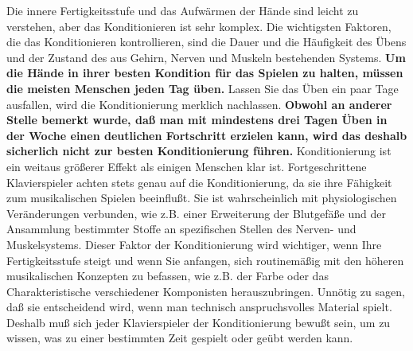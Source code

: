 Die innere Fertigkeitsstufe und das Aufwärmen der Hände sind leicht zu verstehen, aber das Konditionieren ist sehr komplex.
Die wichtigsten Faktoren, die das Konditionieren kontrollieren, sind die Dauer und die Häufigkeit des Übens und der Zustand des aus Gehirn, Nerven und Muskeln bestehenden Systems.
\textbf{Um die Hände in ihrer besten Kondition für das Spielen zu halten, müssen die meisten Menschen jeden Tag üben.}
Lassen Sie das Üben ein paar Tage ausfallen, wird die Konditionierung merklich nachlassen.
\textbf{Obwohl an anderer Stelle bemerkt wurde, daß man mit mindestens drei Tagen Üben in der Woche einen deutlichen Fortschritt erzielen kann, wird das deshalb sicherlich nicht zur besten Konditionierung führen.}
Konditionierung ist ein weitaus größerer Effekt als einigen Menschen klar ist.
Fortgeschrittene Klavierspieler achten stets genau auf die Konditionierung, da sie ihre Fähigkeit zum musikalischen Spielen beeinflußt.
Sie ist wahrscheinlich mit physiologischen Veränderungen verbunden, wie z.B. einer Erweiterung der Blutgefäße und der Ansammlung bestimmter Stoffe an spezifischen Stellen des Nerven- und Muskelsystems.
Dieser Faktor der Konditionierung wird wichtiger, wenn Ihre Fertigkeitsstufe steigt und wenn Sie anfangen, sich routinemäßig mit den höheren musikalischen Konzepten zu befassen, wie z.B. der Farbe oder das Charakteristische verschiedener Komponisten herauszubringen.
Unnötig zu sagen, daß sie entscheidend wird, wenn man technisch anspruchsvolles Material spielt.
Deshalb muß sich jeder Klavierspieler der Konditionierung bewußt sein, um zu wissen, was zu einer bestimmten Zeit gespielt oder geübt werden kann.

